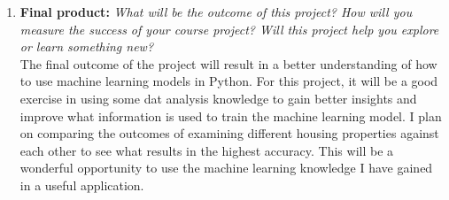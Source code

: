 \documentclass{article}
\begin{document}
\begin{enumerate}
        \item \textbf{Final product:} \textit{What will be the outcome of this project? How will you measure the success of your course project? Will this project help you explore or learn something new?} \\

        The final outcome of the project will result in a better understanding of how to use machine learning models in Python. For this project, it will be a good exercise in using some dat analysis knowledge to gain better insights and improve what information is used to train the machine learning model. I plan on comparing the outcomes of examining different housing properties against each other to see what results in the highest accuracy. This will be a wonderful opportunity to use the machine learning knowledge I have gained in a useful application.

    \end{enumerate}
\end{document}
